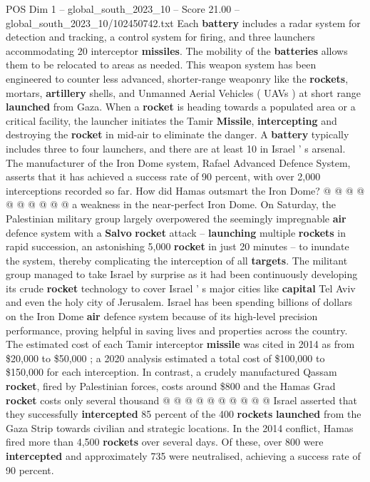 \begin{textsample}{POS Dim 1 – global\_south\_2023\_10 – Score 21.00 – global\_south\_2023\_10/102450742.txt}
Each \textbf{battery} includes a radar system for detection and tracking, a control system for firing, and three launchers accommodating 20 interceptor \textbf{missiles}.
The mobility of the \textbf{batteries} allows them to be relocated to areas as needed.
This weapon system has been engineered to counter less advanced, shorter-range weaponry like the \textbf{rockets}, mortars, \textbf{artillery} shells, and Unmanned Aerial Vehicles ( UAVs ) at short range \textbf{launched} from Gaza.
When a \textbf{rocket} is heading towards a populated area or a critical facility, the launcher initiates the Tamir \textbf{Missile}, \textbf{intercepting} and destroying the \textbf{rocket} in mid-air to eliminate the danger.
A \textbf{battery} typically includes three to four launchers, and there are at least 10 in Israel ' s arsenal.
The manufacturer of the Iron Dome system, Rafael Advanced Defence System, asserts that it has achieved a success rate of 90 percent, with over 2,000 interceptions recorded so far.
How did Hamas outsmart the Iron Dome? @ @ @ @ @ @ @ @ @ @ a weakness in the near-perfect Iron Dome.
On Saturday, the Palestinian military group largely overpowered the seemingly impregnable \textbf{air} defence system with a \textbf{Salvo} \textbf{rocket} attack -- \textbf{launching} multiple \textbf{rockets} in rapid succession, an astonishing 5,000 \textbf{rocket} in just 20 minutes -- to inundate the system, thereby complicating the interception of all \textbf{targets}.
The militant group managed to take Israel by surprise as it had been continuously developing its crude \textbf{rocket} technology to cover Israel ' s major cities like \textbf{capital} Tel Aviv and even the holy city of Jerusalem.
Israel has been spending billions of dollars on the Iron Dome \textbf{air} defence system because of its high-level precision performance, proving helpful in saving lives and properties across the country.
The estimated cost of each Tamir interceptor \textbf{missile} was cited in 2014 as from \$20,000 to \$50,000 ; a 2020 analysis estimated a total cost of \$100,000 to \$150,000 for each interception.
In contrast, a crudely manufactured Qassam \textbf{rocket}, fired by Palestinian forces, costs around \$800 and the Hamas Grad \textbf{rocket} costs only several thousand @ @ @ @ @ @ @ @ @ @ Israel asserted that they successfully \textbf{intercepted} 85 percent of the 400 \textbf{rockets} \textbf{launched} from the Gaza Strip towards civilian and strategic locations.
In the 2014 conflict, Hamas fired more than 4,500 \textbf{rockets} over several days.
Of these, over 800 were \textbf{intercepted} and approximately 735 were neutralised, achieving a success rate of 90 percent.

\end{textsample}
